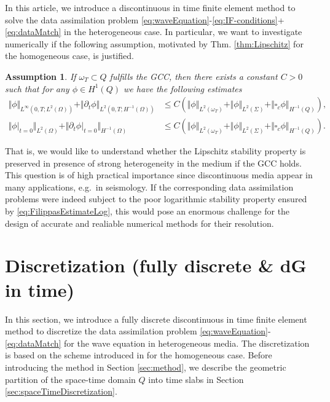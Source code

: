 \documentclass[sn-mathphys-num]{sn-jnl}
\newtheorem{assum}{Assumption}
\numberwithin{equation}{section}
\newcommand{\dt}{\partial_t}
\begin{document}
\noindent In this article, we introduce a discontinuous in time finite element method to solve the data assimilation problem \eqref{eq:waveEquation}-\eqref{eq:IF-conditions}+\eqref{eq:dataMatch} in the heterogeneous case. In particular, we want to investigate numerically if the following assumption, motivated by Thm. \ref{thm:Lipschitz} for the homogeneous case, is justified. 

\begin{assum}\label{assum:LipschitzStability}
    If $\omega_T \subset Q$ fulfills the GCC, then there exists a constant $C > 0$ such that for any $\phi \in H^1(Q)$ we have the following estimates
    \begin{align*}
        \Vert \phi \Vert_{L^\infty(0,T;L^2(\Omega))} + \Vert \dt \phi \Vert_{L^2(0,T;H^{-1}(\Omega))} &\le C \left(  \Vert \phi \Vert_{L^2(\omega_T)} + \Vert \phi \Vert_{L^2(\Sigma)} + \Vert \square_c \phi \Vert_{H^{-1}(Q)} \right), \\
        \Vert \phi \vert_{t = 0} \Vert_{L^2(\Omega)} + \Vert \dt \phi \vert_{t = 0} \Vert_{H^{-1}(\Omega)} &\le C \left(\Vert \phi \Vert_{L^2(\omega_T)} + \Vert \phi \Vert_{L^2(\Sigma)} + \Vert \square_c \phi \Vert_{H^{-1}(Q)} \right). 
    \end{align*}
\end{assum}

That is, we would like to understand whether the Lipschitz stability property is preserved in presence of strong heterogeneity in the medium if the GCC holds. This question is of high practical importance since discontinuous media appear in many applications, e.g.\ in seismology. If the corresponding data assimilation problems were indeed subject to the poor logarithmic stability property ensured by \eqref{eq:FilippasEstimateLog}, this would pose an enormous challenge for the design of accurate and realiable numerical methods for their resolution.

\section{Discretization (fully discrete \& dG in time)} 
\noindent In this section, we introduce a fully discrete discontinuous in time finite element method to discretize the data assimilation problem \eqref{eq:waveEquation}-\eqref{eq:dataMatch} for the wave equation in heterogeneous media. The discretization is based on the scheme introduced in \cite{BP24} for the homogeneous case. Before introducing the method in Section \ref{sec:method}, we describe the geometric partition of the space-time domain $Q$ into time slabs in Section \ref{sec:spaceTimeDiscretization}. 
\end{document}
